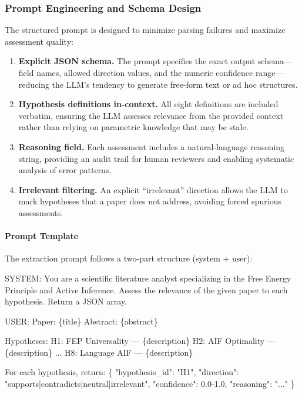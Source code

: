 \documentclass[
  english,
]{article}
\newenvironment{Shaded}{}{}
\newcommand{\NormalTok}[1]{#1}
\begin{document}
\subsubsection{Prompt Engineering and Schema
Design}\label{prompt-engineering-and-schema-design}

The structured prompt is designed to minimize parsing failures and
maximize assessment quality:

\begin{enumerate}
\def\labelenumi{\arabic{enumi}.}
\item
  \textbf{Explicit JSON schema.} The prompt specifies the exact output
  schema---field names, allowed direction values, and the numeric
  confidence range---reducing the LLM's tendency to generate free-form
  text or ad hoc structures.
\item
  \textbf{Hypothesis definitions in-context.} All eight definitions are
  included verbatim, ensuring the LLM assesses relevance from the
  provided context rather than relying on parametric knowledge that may
  be stale.
\item
  \textbf{Reasoning field.} Each assessment includes a natural-language
  reasoning string, providing an audit trail for human reviewers and
  enabling systematic analysis of error patterns.
\item
  \textbf{Irrelevant filtering.} An explicit ``irrelevant'' direction
  allows the LLM to mark hypotheses that a paper does not address,
  avoiding forced spurious assessments.
\end{enumerate}

\paragraph{Prompt Template}\label{prompt-template}

The extraction prompt follows a two-part structure (system + user):

\begin{Shaded}
\begin{Highlighting}[]
\NormalTok{SYSTEM: You are a scientific literature analyst specializing in the}
\NormalTok{Free Energy Principle and Active Inference. Assess the relevance of}
\NormalTok{the given paper to each hypothesis. Return a JSON array.}

\NormalTok{USER:}
\NormalTok{Paper: \{title\}}
\NormalTok{Abstract: \{abstract\}}

\NormalTok{Hypotheses:}
\NormalTok{H1: FEP Universality — \{description\}}
\NormalTok{H2: AIF Optimality — \{description\}}
\NormalTok{...}
\NormalTok{H8: Language AIF — \{description\}}

\NormalTok{For each hypothesis, return:}
\NormalTok{\{}
\NormalTok{  "hypothesis\_id": "H1",}
\NormalTok{  "direction": "supports|contradicts|neutral|irrelevant",}
\NormalTok{  "confidence": 0.0{-}1.0,}
\NormalTok{  "reasoning": "..."}
\NormalTok{\}}
\end{Highlighting}
\end{Shaded}
\end{document}
